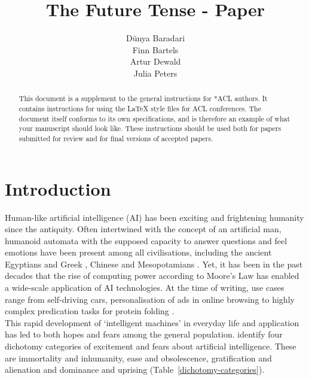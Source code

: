 \documentclass[11pt]{article}
\title{The Future Tense - Paper}
\author{Dünya Baradari\\\And
  Finn Bartels \\\And
  Artur Dewald \\\And
  Julia Peters}
\begin{document}
\maketitle
\begin{abstract}
This document is a supplement to the general instructions for *ACL authors. It contains instructions for using the \LaTeX{} style files for ACL conferences.
The document itself conforms to its own specifications, and is therefore an example of what your manuscript should look like.
These instructions should be used both for papers submitted for review and for final versions of accepted papers.
\end{abstract} 


\section{Introduction}

Human-like artificial intelligence (AI) has been exciting and frightening humanity since the antiquity. 
Often intertwined with the concept of an artificial man, humanoid automata with the supposed capacity to answer questions and feel emotions have been present among all civilisations, including the ancient Egyptians and Greek \citep{Newquist1994}, Chinese \citep{cohen1986} and Mesopotamians \citep{unat2008}. 
Yet, it has been in the past decades that the rise of computing power according to Moore’s Law has enabled a wide-scale application of AI technologies. At the time of writing, use cases range from self-driving cars, personalisation of ads in online browsing to highly complex predication tasks for protein folding \citep{jumper2021}. \\
This rapid development of ‘intelligent machines’ in everyday life and application has led to both hopes and fears among the general population. 
\citet{cave2019} identify four dichotomy categories of excitement and fears about artificial intelligence. These are immortality and inhumanity, ease and obsolescence, gratification and alienation and dominance and uprising (Table~\ref{dichotomy-categories}).
\end{document}
